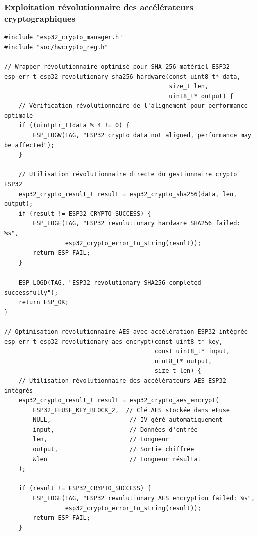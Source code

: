 \subsubsection{Exploitation révolutionnaire des accélérateurs cryptographiques}

\begin{lstlisting}[caption={Optimisations révolutionnaires cryptographiques ESP32 intégré}]
#include "esp32_crypto_manager.h"
#include "soc/hwcrypto_reg.h"

// Wrapper révolutionnaire optimisé pour SHA-256 matériel ESP32
esp_err_t esp32_revolutionary_sha256_hardware(const uint8_t* data, 
                                              size_t len, 
                                              uint8_t* output) {
    // Vérification révolutionnaire de l'alignement pour performance optimale
    if ((uintptr_t)data % 4 != 0) {
        ESP_LOGW(TAG, "ESP32 crypto data not aligned, performance may be affected");
    }
    
    // Utilisation révolutionnaire directe du gestionnaire crypto ESP32
    esp32_crypto_result_t result = esp32_crypto_sha256(data, len, output);
    if (result != ESP32_CRYPTO_SUCCESS) {
        ESP_LOGE(TAG, "ESP32 revolutionary hardware SHA256 failed: %s", 
                 esp32_crypto_error_to_string(result));
        return ESP_FAIL;
    }
    
    ESP_LOGD(TAG, "ESP32 revolutionary SHA256 completed successfully");
    return ESP_OK;
}

// Optimisation révolutionnaire AES avec accélération ESP32 intégrée
esp_err_t esp32_revolutionary_aes_encrypt(const uint8_t* key, 
                                          const uint8_t* input, 
                                          uint8_t* output, 
                                          size_t len) {
    // Utilisation révolutionnaire des accélérateurs AES ESP32 intégrés
    esp32_crypto_result_t result = esp32_crypto_aes_encrypt(
        ESP32_EFUSE_KEY_BLOCK_2,  // Clé AES stockée dans eFuse
        NULL,                      // IV géré automatiquement
        input,                     // Données d'entrée
        len,                       // Longueur
        output,                    // Sortie chiffrée
        &len                       // Longueur résultat
    );
    
    if (result != ESP32_CRYPTO_SUCCESS) {
        ESP_LOGE(TAG, "ESP32 revolutionary AES encryption failed: %s", 
                 esp32_crypto_error_to_string(result));
        return ESP_FAIL;
    }
    

\end{lstlisting}
